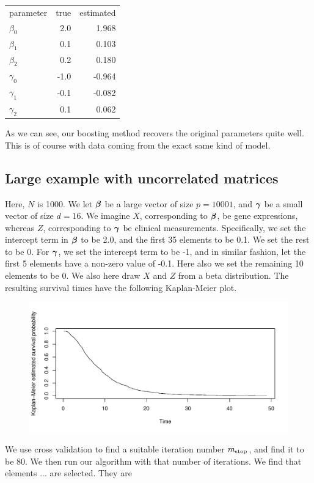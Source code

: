 \begin{tabular}{lrr}
    parameter  & true & estimated \\
    $\beta_0$  &  2.0 &     1.968 \\
    $\beta_1$  &  0.1 &     0.103 \\
    $\beta_2$  &  0.2 &     0.180 \\
    $\gamma_0$ & -1.0 &    -0.964 \\
    $\gamma_1$ & -0.1 &    -0.082 \\
    $\gamma_2$ &  0.1 &     0.062 \\
\end{tabular}

As we can see, our boosting method recovers the original parameters quite well. This is of course with data coming from the exact same kind of model.

\subsection{Large example with uncorrelated matrices}
Here, $N$ is 1000. We let $\boldsymbol{\beta}$ be a large vector of size $p=10001$, and $\boldsymbol{\gamma}$ be a small vector of size $d=16$. We imagine $X$, corresponding to $\boldsymbol{\beta}$, be gene expressions, whereas $Z$, corresponding to $\boldsymbol{\gamma}$ be clinical measurements. Specifically, we set the intercept term in $\boldsymbol{\beta}$ to be 2.0, and the first 35 elements to be 0.1. We set the rest to be 0. For $\boldsymbol{\gamma}$, we set the intercept term to be -1, and in similar fashion, let the first 5 elements have a non-zero value of -0.1. Here also we set the remaining 10 elements to be 0.
We also here draw $X$ and $Z$ from a beta distribution. The resulting survival times have the following Kaplan-Meier plot.
\begin{figure}[H]\centering\includegraphics[scale=0.4]{figures/case2.pdf}\end{figure}
We use cross validation to find a suitable iteration number $m_{\text{stop}}$, and find it to be 80. We then run our algorithm with that number of iterations. We find that elements ... are selected. They are 

